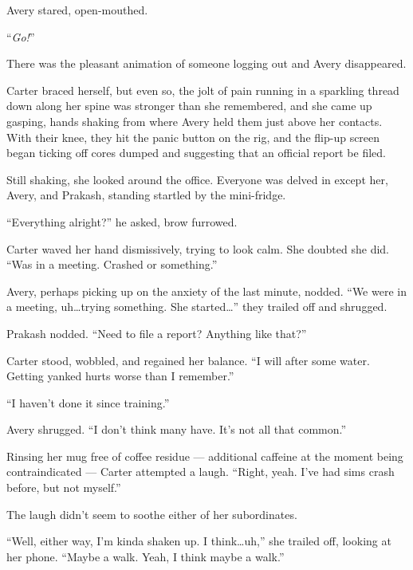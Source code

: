 Avery stared, open-mouthed.

``\emph{Go!}''

There was the pleasant animation of someone logging out and Avery disappeared.

Carter braced herself, but even so, the jolt of pain running in a sparkling thread down along her spine was stronger than she remembered, and she came up gasping, hands shaking from where Avery held them just above her contacts. With their knee, they hit the panic button on the rig, and the flip-up screen began ticking off cores dumped and suggesting that an official report be filed.

Still shaking, she looked around the office. Everyone was delved in except her, Avery, and Prakash, standing startled by the mini-fridge.

``Everything alright?'' he asked, brow furrowed.

Carter waved her hand dismissively, trying to look calm. She doubted she did. ``Was in a meeting. Crashed or something.''

Avery, perhaps picking up on the anxiety of the last minute, nodded. ``We were in a meeting, uh\ldots{}trying something. She started\ldots{}'' they trailed off and shrugged.

Prakash nodded. ``Need to file a report? Anything like that?''

Carter stood, wobbled, and regained her balance. ``I will after some water. Getting yanked hurts worse than I remember.''

``I haven't done it since training.''

Avery shrugged. ``I don't think many have. It's not all that common.''

Rinsing her mug free of coffee residue — additional caffeine at the moment being contraindicated — Carter attempted a laugh. ``Right, yeah. I've had sims crash before, but not myself.''

The laugh didn't seem to soothe either of her subordinates.

``Well, either way, I'm kinda shaken up. I think\ldots{}uh,'' she trailed off, looking at her phone. ``Maybe a walk. Yeah, I think maybe a walk.''
